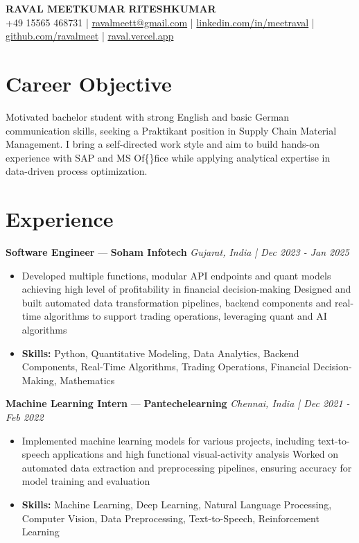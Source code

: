 \documentclass[a4paper,10pt]{article}
\begin{document}
\begin{center}
  {\Large\bfseries RAVAL MEETKUMAR RITESHKUMAR}\\[2pt]
  {\small +49 15565 468731 \;|\; \href{mailto:ravalmeett@gmail.com}{ravalmeett@gmail.com} \;|\; \href{https://www.linkedin.com/in/meetraval/}{linkedin.com/in/meetraval} \;|\; \href{https://github.com/ravalmeet}{github.com/ravalmeet} \;|\; \href{https://raval.vercel.app/}{raval.vercel.app}}
\end{center}
\vspace{-3pt}

\section*{Career Objective}
Motivated bachelor student with strong English and basic German communication skills, seeking a Praktikant position in Supply Chain Material Management. I bring a self-directed work style and aim to build hands-on experience with SAP and MS Of\{\}fice while applying analytical expertise in data-driven process optimization.\par

\section*{Experience}
\textbf{Software Engineer} — \textbf{Soham Infotech} \hfill \textit{Gujarat, India \;|\; Dec 2023 - Jan 2025}\par
\vspace{1pt}
\begin{itemize}
  \item Developed multiple functions, modular API endpoints and quant models achieving high level of profitability in financial decision-making Designed and built automated data transformation pipelines, backend components and real-time algorithms to support trading operations, leveraging quant and AI algorithms
  \item \textbf{Skills:} Python, Quantitative Modeling, Data Analytics, Backend Components, Real-Time Algorithms, Trading Operations, Financial Decision-Making, Mathematics
\end{itemize}
\vspace{3pt}
\textbf{Machine Learning Intern} — \textbf{Pantechelearning} \hfill \textit{Chennai, India \;|\; Dec 2021 - Feb 2022}\par
\vspace{1pt}
\begin{itemize}
  \item Implemented machine learning models for various projects, including text-to-speech applications and high functional visual-activity analysis Worked on automated data extraction and preprocessing pipelines, ensuring accuracy for model training and evaluation
  \item \textbf{Skills:} Machine Learning, Deep Learning, Natural Language Processing, Computer Vision, Data Preprocessing, Text-to-Speech, Reinforcement Learning
\end{itemize}
\end{document}
